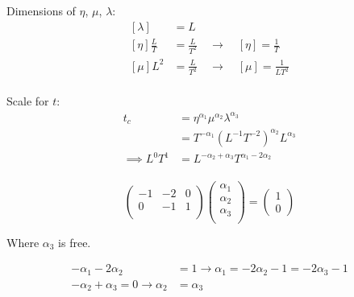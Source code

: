 \documentclass[12pt]{article}
\begin{document}
Dimensions of $\eta$, $\mu$, $\lambda$:
\begin{equation}
  \begin{aligned}
    [\lambda] &= L \\
    [\eta]\frac{L}{T} &= \frac{L}{T^2} \quad\longrightarrow\quad [\eta] = \frac{1}{T} \\
    [\mu]L^2 &= \frac{L}{T^2} \quad\longrightarrow\quad [\mu] = \frac{1}{LT^2} \\
  \end{aligned}
\end{equation}

Scale for $t$:
\begin{equation}
  \begin{aligned}
    t_c &= \eta^{\alpha_1}\mu^{\alpha_2}\lambda^{\alpha_3} \\
    &= T^{-\alpha_1}{(L^{-1}T^{-2})}^{\alpha_2}L^{\alpha_3} \\
    \implies L^0T^1 &= L^{-\alpha_2+\alpha_3}T^{\alpha_1-2\alpha_2} \\
  \end{aligned}
\end{equation}

\begin{equation}
  \begin{pmatrix}
    -1 & -2 & 0 \\
    0 & -1 & 1 \\
  \end{pmatrix}
\begin{pmatrix}
  \alpha_1 \\
  \alpha_2 \\
  \alpha_3 \\
\end{pmatrix}
=
\begin{pmatrix}
  1\\0
\end{pmatrix}
\end{equation}

Where $\alpha_3$ is free.

\begin{equation}
  \begin{aligned}
    -\alpha_1-2\alpha_2 &= 1 \rightarrow \alpha_1=-2\alpha_2-1=-2\alpha_3-1\\
    -\alpha_2 + \alpha_3 = 0 \rightarrow \alpha_2&=\alpha_3
  \end{aligned}
\end{equation}
\end{document}
